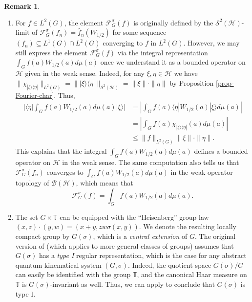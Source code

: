 \documentclass[12pt,reqno]{amsart}
\theoremstyle{definition}
\theoremstyle{definition}
\theoremstyle{definition}
\newtheorem{rem}[thm]{Remark}
\numberwithin{thm}{section}
\numberwithin{equation}{section}
\newcommand{\la}{\langle}
\newcommand{\ra}{\rangle}
\newcommand{\F}{\mathcal{F}}
\newcommand{\Hi}{\mathcal{H}}
\newcommand{\tor}{\mathbb{T}}
\newcommand{\mc}[1]{\mathcal #1}
\begin{document}
\begin{rem}\label{rem-typeI-condition}${}$
    \begin{enumerate}
    
         \item For $f\in L^2(G)$, the element $\F^\sigma_G(f)$ is originally defined by the $\mc S^2(\Hi)$-limit of $\F^\sigma_G(f_n) = \hat{f}_n(W_{1/2})$ for some sequence $(f_n) \subseteq L^1(G)\cap L^2(G)$ converging to $f$ in $L^2(G)$. However, we may still express the element $\F^\sigma_G(f)$ via the integral representation $\int_G f( a ) W_{1/2}( a ) d\mu( a )$ once we understand it as a bounded operator on $\Hi$ given in the weak sense.
         Indeed, for any $\xi, \eta \in \Hi$ we have $\|\chi_{|\xi\ra\la \eta|}\|_{L^2(G)} = \| |\xi\ra\la \eta| \|_{\mc S^2(\Hi)} = \|\xi\| \cdot \|\eta\|$ by Proposition \ref{prop-Fourier-char}.
         Thus,
            \begin{align*}
            |\la\eta |\int_{G}f( a )W_{1/2}( a )d\mu( a )|\xi\ra|
            & = \left |\int_{G}f( a )\la\eta |W_{1/2}( a )|\xi\ra d\mu( a )\right |\\
            & = \left |\int_{G}f( a )\chi_{|\xi\ra\la \eta|}(a) d\mu( a )\right |\\
            & \le \|f\|_{L^2(G)} \|\xi\| \cdot \|\eta\|.
            \end{align*}
        This explains that the integral $\int_G f(a) W_{1/2}(a) d\mu(a)$ defines a bounded operator on $\Hi$ in the weak sense. The same computation also tells us that $\F^\sigma_G(f_n)$ converges to $\int_G f(a) W_{1/2}(a) d\mu(a)$ in the weak operator topology of $\mc B(\Hi)$, which means that
            $$\F^\sigma_G(f) = \int_G f(a) W_{1/2}(a) d\mu(a).$$
    
        \item The set $G \times \tor$ can be equipped with the ``Heisenberg'' group law $(x,z)\cdot (y,w) = (x+y, zw\sigma(x,y))$. We denote the resulting locally compact group by $G(\sigma)$, which is a {\em central extension} of $G$. The original version of \cite[Theorem 7.1]{KleppnerLipsman72} (which applies to more general classes of groups) assumes that $G(\sigma)$ has a {\em type I} regular representation, which is the case for any abstract quantum kinematical system $(G,\sigma)$. Indeed, the quotient space $G(\sigma)/G$ can easily be identified with the group $\tor$, and the canonical Haar measure on $\tor$ is $G(\sigma)$-invariant as well. Thus, we can apply \cite[Theorem 1]{Kallman70} to conclude that $G(\sigma)$ is type I.
    \end{enumerate}
\end{rem}
\end{document}
